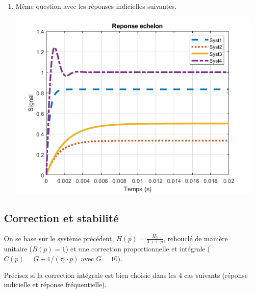 \begin{enumerate}
	\item Même question avec les réponses indicielles suivantes.

\begin{center}
	\includegraphics[width=15cm]{images/TD/sys_boucle_step.png}
\end{center}
\end{enumerate}

\subsection*{Correction et stabilité}

On se base sur le système précédent, $H(p) = \frac{H_0}{1 + \tau \cdot p}$, rebouclé de manière unitaire ($B(p) = 1$) et une correction proportionnelle et intégrale ($C(p) = G + 1/(\tau_i \cdot p)$ avec $G = 10$).

Précisez si la correction intégrale est bien choisie dans les 4 cas suivants (réponse indicielle et réponse fréquentielle).

